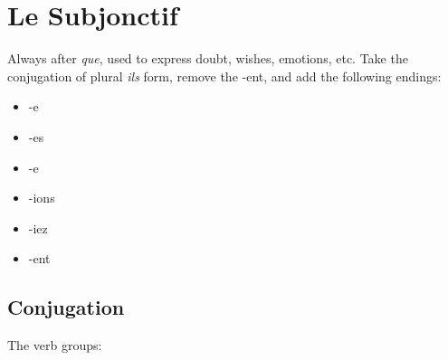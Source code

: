 \documentclass{book}
\begin{document}
\chapter{Le Subjonctif}
Always after \textit{que}, used to express doubt, wishes, emotions, etc. Take the conjugation of plural \textit{ils} form, remove the -ent, and add the following endings:
    \begin{itemize}
        \item -e
        \item -es
        \item -e
        \item -ions
        \item -iez
        \item -ent
    \end{itemize}

\section{Conjugation}
    The verb groups:
\end{document}
